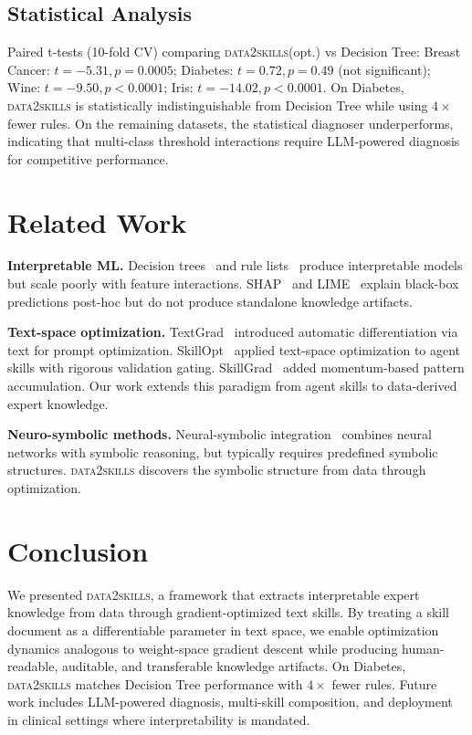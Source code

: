 \documentclass{article}
\begin{document}
\subsection{Statistical Analysis}

Paired t-tests (10-fold CV) comparing \textsc{data2skills}(opt.) vs Decision Tree:
Breast Cancer: $t=-5.31, p=0.0005$; Diabetes: $t=0.72, p=0.49$ (not significant); 
Wine: $t=-9.50, p<0.0001$; Iris: $t=-14.02, p<0.0001$.
On Diabetes, \textsc{data2skills} is statistically indistinguishable from Decision Tree while using $4\times$ fewer rules.
On the remaining datasets, the statistical diagnoser underperforms, indicating that multi-class threshold interactions require LLM-powered diagnosis for competitive performance.

\section{Related Work}

\textbf{Interpretable ML.} Decision trees~\cite{breiman1984} and rule lists~\cite{letham2015} produce interpretable models but scale poorly with feature interactions. SHAP~\cite{lundberg2017} and LIME~\cite{ribeiro2016} explain black-box predictions post-hoc but do not produce standalone knowledge artifacts.

\textbf{Text-space optimization.} TextGrad~\cite{textgrad2024} introduced automatic differentiation via text for prompt optimization. SkillOpt~\cite{skillopt2026} applied text-space optimization to agent skills with rigorous validation gating. SkillGrad~\cite{skillgrad2026} added momentum-based pattern accumulation. Our work extends this paradigm from agent skills to data-derived expert knowledge.

\textbf{Neuro-symbolic methods.} Neural-symbolic integration~\cite{garcez2019} combines neural networks with symbolic reasoning, but typically requires predefined symbolic structures. \textsc{data2skills} discovers the symbolic structure from data through optimization.

\section{Conclusion}

We presented \textsc{data2skills}, a framework that extracts interpretable expert knowledge from data through gradient-optimized text skills. By treating a skill document as a differentiable parameter in text space, we enable optimization dynamics analogous to weight-space gradient descent while producing human-readable, auditable, and transferable knowledge artifacts. On Diabetes, \textsc{data2skills} matches Decision Tree performance with $4\times$ fewer rules. Future work includes LLM-powered diagnosis, multi-skill composition, and deployment in clinical settings where interpretability is mandated.
\end{document}
